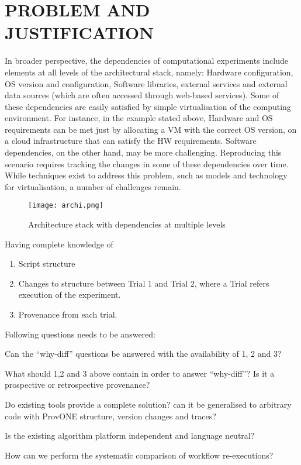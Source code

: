 \documentclass[6pt,,a4paper]{article}
\begin{document}
\section{\textbf{PROBLEM AND JUSTIFICATION}}
In broader perspective, the dependencies of computational experiments include elements at all levels of the architectural stack, namely: Hardware configuration, OS version and configuration, Software libraries, external services and external data sources (which are often accessed through web-based services).
Some of these dependencies are easily satisfied by simple virtualisation of the computing environment. For instance, in the example stated above, Hardware and OS requirements can be met just by allocating a VM with the correct OS version, on a cloud infrastructure that can satisfy the HW requirements. Software dependencies, on the other hand, may be more challenging. Reproducing this scenario requires tracking the changes in some of these dependencies over time. While techniques exist to address this problem, such as models and technology for virtualisation, a number of challenges remain. 
\begin{figure}[h]
\begin{center}
            \texttt{[image: archi.png]}
\end{center}
\caption{Architecture stack with dependencies at multiple levels}
\end{figure}
\newline Having complete knowledge of 
\begin{enumerate} \label{data}
       \item Script structure
        \item Changes to structure between Trial 1 and Trial 2, where a Trial refers execution of the experiment. 
          \item Provenance from each trial.
\end{enumerate}
Following questions needs \break to be answered:
\begin{description} \label{data}
   \item [Q1] Can the “why-diff” questions be answered with the availability of 1, 2 and 3?
   \item [Q2] What should 1,2 and 3 above contain in order to answer “why-diff”? Is it a prospective or retrospective provenance?
   \item [Q3] Do existing tools provide a complete solution? can it be generalised to arbitrary code with ProvONE structure, version changes and traces?
   \item  [Q4] Is the existing algorithm platform independent and language neutral?
   \item [Q5] How can we perform the systematic comparison of workflow re-executions?
\end{description}
\end{document}
